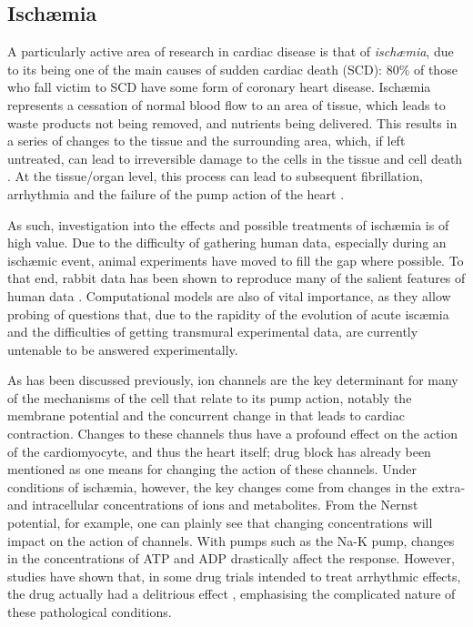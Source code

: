 \documentclass[../thesis-main.tex]{subfiles}
\begin{document}
 \subsection{Isch\ae mia}
 \label{subsec:ischaemia}
 A particularly active area of research in cardiac disease is that of \emph{isch\ae mia}, due to its being one of the main causes of sudden cardiac death (SCD): $80\%$ of those who fall victim to SCD have some form of coronary heart disease. Isch\ae mia represents a cessation of normal blood flow to an area of tissue, which leads to waste products not being removed, and nutrients being delivered. This results in a series of changes to the tissue and the surrounding area, which, if left untreated, can lead to irreversible damage to the cells in the tissue and cell death \citep{Carmeliet1999}. At the tissue/organ level, this process can lead to subsequent fibrillation, arrhythmia and the failure of the pump action of the heart \citep{Harris1954}.
 
 As such, investigation into the effects and possible treatments of isch\ae mia  is of high value. Due to the difficulty of gathering human data, especially during an isch\ae mic event, animal experiments have moved to fill the gap where possible. To that end, rabbit data has been shown to reproduce many of the salient features of human data \citep{Panfilov2006}. Computational models are also of vital importance, as they allow probing of questions that, due to the rapidity of the evolution of acute isc\ae mia and the difficulties of getting transmural experimental data, are currently untenable to be answered experimentally.
 
 As has been discussed previously, ion channels are the key determinant for many of the mechanisms of the cell that relate to its pump action, notably the membrane potential and the concurrent change in \cai{} that leads to cardiac contraction. Changes to these channels thus have a profound effect on the action of the cardiomyocyte, and thus the heart itself; drug block has already been mentioned as one means for changing the action of these channels. Under conditions of isch\ae mia, however, the key changes come from changes in the extra- and intracellular concentrations of ions and metabolites. From the Nernst potential, for example, one can plainly see that changing concentrations will impact on the action of channels. With pumps such as the Na-K pump, changes in the concentrations of ATP and ADP drastically affect the response. However, studies have shown that, in some drug trials intended to treat arrhythmic effects, the drug actually had a delitrious effect \citep{Chen1998}, emphasising the complicated nature of these pathological conditions.
 
\end{document}
